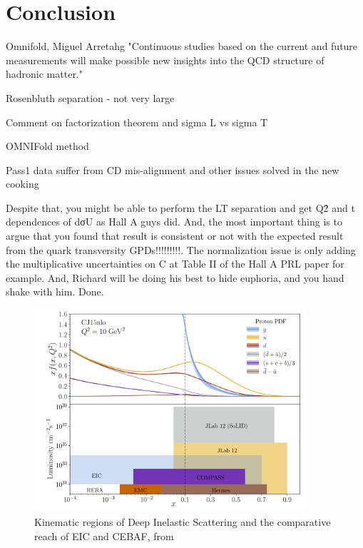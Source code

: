 %    

\clearpage
\section{Conclusion}
    Omnifold, Miguel Arretahg
     "Continuous
    studies based on the current and future measurements will make possible new insights
    into the QCD structure of hadronic matter."
    
    Rosenbluth separation - not very large
    
    
    Comment on factorization theorem and sigma L vs sigma T
    
    OMNIFold method
    
    Pass1 data suffer from CD mis-alignment and other issues solved in the new cooking
    
    
    Despite that, you might be able to perform the LT separation and get Q\^2 and t dependences of dσU as Hall A guys did. And, the most important thing is to argue that you found that result is consistent or not with the expected result from the quark transversity GPDs!!!!!!!!!. The normalization issue is only adding the multiplicative uncertainties on C at Table II of the Hall A PRL paper for example. And, Richard will be doing his best to hide euphoria, and you hand shake with him. Done.
    
    
    
    
    \begin{figure}
        \centering
        \includegraphics[width=0.9\textwidth]{Chapters/Ch5-Further/X_conclusion/pics/future.png}
        \caption[Kinematic Overlap of Future Experiments]{Kinematic regions of Deep Inelastic Scattering and the comparative reach of EIC and CEBAF, from \parencite{Arrington2022PhysicsOpportunities} }
        \label{fig:physics_future_ranges}
    \end{figure}
    










